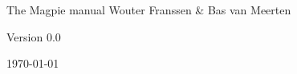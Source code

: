 %
%
%
%

\begin{titlepage}
\begin{center}




{\Huge The Magpie manual}
\vfill
\large Wouter Franssen \& Bas van Meerten

\vspace{1cm}
\large Version 0.0
\vfill


\vfill
\vfill
{\large \today}

\end{center}

\end{titlepage}
